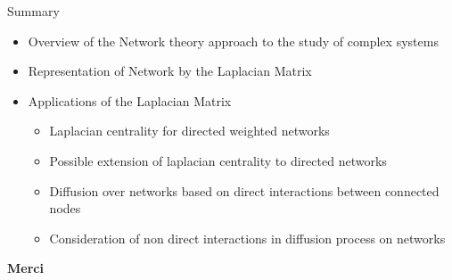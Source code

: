 \documentclass[10pt]{beamer}
\begin{document}
\begin{frame}{Summary}
	\begin{itemize}
		\item Overview of the Network theory approach to the study of complex systems
		\item Representation of Network by the Laplacian Matrix
		\item Applications of the Laplacian Matrix 
		\begin{itemize}
			\item Laplacian centrality for directed weighted networks 
			\item  Possible extension of laplacian centrality to directed networks
			\item Diffusion over networks based on direct interactions between connected nodes
			\item Consideration of non direct interactions in diffusion process on networks
			
		\end{itemize}
	\end{itemize}
	
\end{frame}




%	
%	
%	

{\2
\begin{frame}
	\begin{center}
		\Huge{\textbf{Merci}}
	\end{center}
\end{frame}}

\end{document}
